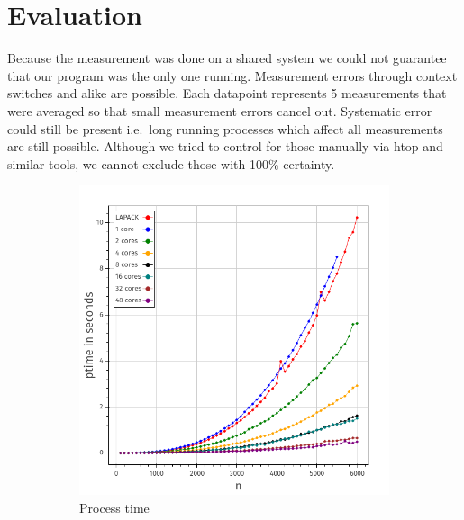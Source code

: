 \documentclass[a4paper,final,ngerman,english]{article}
\begin{document}
\section{Evaluation}
Because the measurement was done on a shared system
we could not guarantee that our program was the only one running.
Measurement errors through context switches and alike are possible.
Each datapoint represents 5 measurements that were averaged so that small measurement errors cancel out.
Systematic error could still be present i.e.\ long running processes which affect all measurements
are still possible. Although we tried to control for those manually via htop and similar tools, we cannot exclude
those with 100\% certainty.

\begin{figure}[h!]
	\centering
	\begin{subfigure}{0.46\textwidth}
		\includegraphics[width=\textwidth]{ptime}
		\caption{Process time}
\label{fig:runtime}
	\end{subfigure}
	\begin{subfigure}{0.46\textwidth}

\end{subfigure}
\end{figure}
\end{document}
